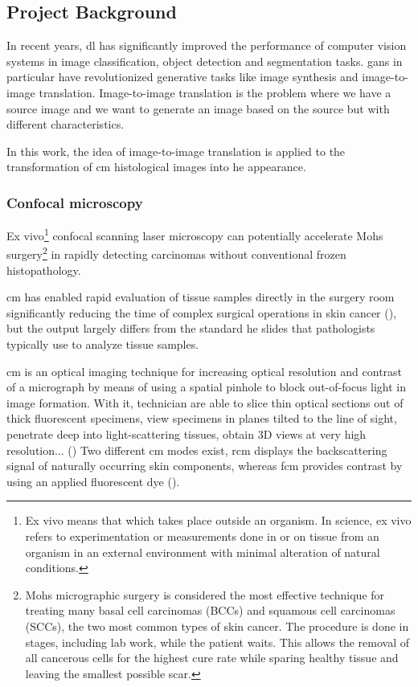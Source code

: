 \documentclass[../main.tex]{subfiles}
\begin{document}
\subsection{Project Background}
\label{sec:project-background}

In recent years, \gls{dl} has significantly improved the
performance of computer vision systems in image classification, object
detection and segmentation tasks.
\gls{gans} in particular have revolutionized generative tasks like image synthesis
and image-to-image translation. Image-to-image translation is the
problem where we have a source image and we want to generate an image
based on the source but with different characteristics.

In this work, the idea of image-to-image translation is applied
to the transformation of \gls{cm} histological images into \gls{he} appearance.

\subsubsection{Confocal microscopy}
Ex vivo\footnote{Ex vivo means that which takes place outside an organism.
In science, ex vivo refers to experimentation or measurements done in or on
tissue from an organism in an external environment with minimal alteration
of natural conditions.} confocal scanning laser microscopy can potentially
accelerate Mohs surgery\footnote{Mohs micrographic surgery is considered the
most effective technique for treating many basal cell carcinomas (BCCs) and
squamous cell carcinomas (SCCs), the two most common types of skin cancer.
The procedure is done in stages, including lab work, while the patient waits.
This allows the removal of all cancerous cells for the highest cure rate
while sparing healthy tissue and leaving the smallest possible scar.}
in rapidly detecting carcinomas without conventional frozen histopathology.

\gls{cm} has enabled rapid evaluation of tissue samples
directly in the surgery room significantly reducing the time of complex
surgical operations in skin cancer (\cite{Cinotti2018}),
but the output largely differs from the standard \gls{he} slides that
pathologists typically use to analyze tissue samples.

\gls{cm} is an optical imaging technique for increasing optical resolution
and contrast of a micrograph by means of using a spatial pinhole to block
out-of-focus light in image formation. With it, technician are able to slice
thin optical sections out of thick fluorescent specimens, view specimens
in planes tilted to the line of sight, penetrate deep into light-scattering
tissues, obtain 3D views at very high resolution... (\cite{Inoue2006})
Two different \gls{cm} modes exist, \gls{rcm} displays the backscattering signal
of naturally occurring skin components, whereas \gls{fcm} provides contrast
by using an applied fluorescent dye (\cite{Skvara2012}).
\end{document}
